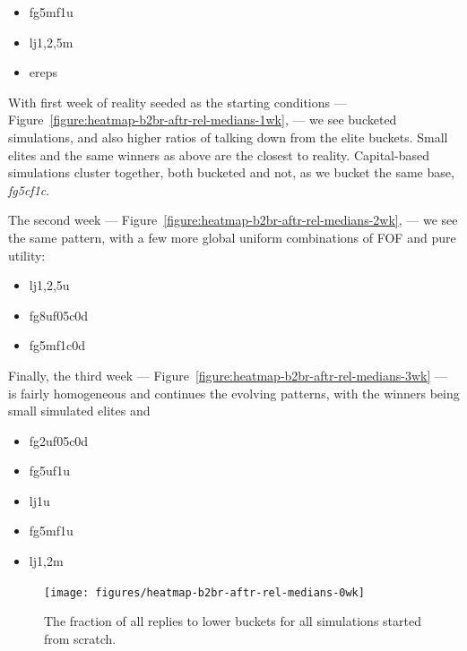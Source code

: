 \documentclass[10pt,oneside]{memoir}
\begin{document}
\begin{Spacing}{2}
\begin{itemize}
\item fg5mf1u

\item lj{1,2,5}m

\item ereps
\end{itemize}

With first week of reality seeded as the starting conditions --- Figure~\ref{figure:heatmap-b2br-aftr-rel-medians-1wk}, --- we see bucketed simulations, and also higher ratios of talking down from the elite buckets.  Small elites and the same winners as above are the closest to reality.   Capital-based simulations cluster together, both bucketed and not, as we bucket the same base, {\itshape fg5cf1c}.


The second week --- Figure~\ref{figure:heatmap-b2br-aftr-rel-medians-2wk}, --- we see the same pattern, with a few more global uniform combinations of FOF and pure utility:


\begin{itemize}


\item lj{1,2,5}u

\item fg8uf05c0d

\item fg5mf1c0d
\end{itemize}

Finally, the third week --- Figure~\ref{figure:heatmap-b2br-aftr-rel-medians-3wk} --- is fairly homogeneous and continues the evolving patterns, with the winners being small simulated elites and


\begin{itemize}


\item fg2uf05c0d

\item fg5uf1u

\item lj1u

\item fg5mf1u

\item lj{1,2}m
\end{itemize}


\begin{figure}
\begin{center}
    \texttt{[image: figures/heatmap-b2br-aftr-rel-medians-0wk]}
    \caption{The fraction of all replies to lower buckets for all simulations started from scratch.}
    \label{figure:heatmap-b2br-aftr-rel-medians-0wk}
\end{center}
\end{figure}


\end{Spacing}
\end{document}
